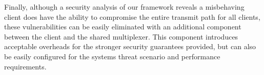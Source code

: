 Finally, although a security analysis of our framework reveals a misbehaving client does have the ability to compromise
the entire transmit path for all clients, these vulnerabilities can be easily eliminated with an additional component between 
the client and the shared multiplexer. This component introduces acceptable overheads for the stronger security
guarantees provided, but can also be easily configured for the systems threat scenario and performance requirements. 

